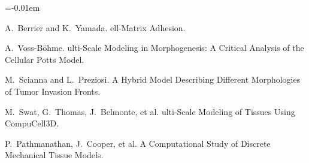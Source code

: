 \documentclass[landscape,a0paper,fontscale=0.292]{baposter}
\begin{document}
\begin{poster}
{\begin{thebibliography}{1}\itemsep=-0.01em

\setlength{\baselineskip}{0.4em}

A.~Berrier and K.~Yamada.
ell-Matrix {A}dhesion.

A.~Voss-B\"{o}hme.
ulti-{S}cale {M}odeling in {M}orphogenesis: A {C}ritical {A}nalysis of the {C}ellular {P}otts {M}odel.

M.~Scianna and L.~Preziosi.
\newblock A {H}ybrid {M}odel Describing Different {M}orphologies of {T}umor {I}nvasion {F}ronts.

M.~Swat, G.~Thomas, J.~Belmonte, et al.
ulti-Scale {M}odeling of {T}issues Using {C}ompuCell3D.

P.~Pathmanathan, J.~Cooper, et al.
\newblock A {C}omputational {S}tudy of {D}iscrete {M}echanical {T}issue {M}odels.

\end{thebibliography}
}


\end{poster}
\end{document}

